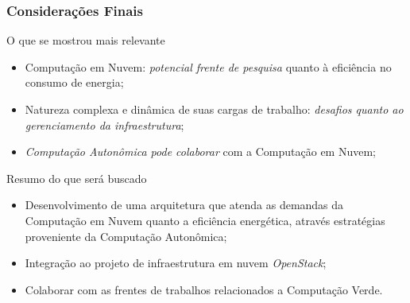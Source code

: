 \frame
{
\frametitle{Considerações Finais}
	\begin{block}{O que se mostrou mais relevante}\footnotesize
 		\begin{itemize}
			\item Computação em Nuvem: \textit{potencial frente de pesquisa} quanto à eficiência no consumo de energia;
			\item Natureza complexa e dinâmica de suas cargas de trabalho: \textit{desafios quanto ao gerenciamento da infraestrutura};
			\item \textit{Computação Autonômica pode colaborar} com a Computação em Nuvem;
 	   \end{itemize}
	\end{block}
	\begin{block}{Resumo do que será buscado}\footnotesize
 		\begin{itemize}
			\item Desenvolvimento de uma arquitetura que atenda as demandas da Computação em Nuvem quanto a eficiência energética, através estratégias proveniente da Computação Autonômica;
			\item Integração ao projeto de infraestrutura em nuvem \textit{OpenStack};
			\item Colaborar com as frentes de trabalhos relacionados a Computação Verde.
 \end{itemize}
\end{block}
}



